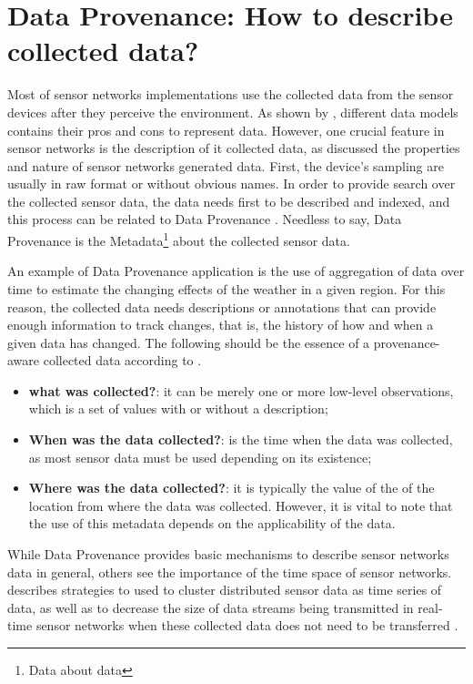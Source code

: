 \section{Data Provenance: How to describe collected data?}
\label{sec:sn-provenance}

Most of sensor networks implementations use the collected data from the sensor
devices after they perceive the environment. As shown by
\cite{sn-data-model-survey}, different data models contains their pros and
cons to represent data. However, one crucial feature in sensor networks is the
description of it collected data, as \cite{sn-provenance} discussed the
properties and nature of sensor networks generated data. First, the device's
sampling are usually in raw format or without obvious names. In order to
provide search over the collected sensor data, the data needs first to be
described and indexed, and this process can be related to Data Provenance
\cite{db-provenance}. Needless to say, Data Provenance is the
Metadata\footnote{Data about data} about the collected sensor data.

An example of Data Provenance application is the use of aggregation of data
over time to estimate the changing effects of the weather in a given region.
For this reason, the collected data needs descriptions or annotations that can
provide enough information to track changes, that is, the history of how and
when a given data has changed. The following should be the essence of a
provenance-aware collected data according to \cite{sn-provenance}.

\begin{itemize}
  \item \textbf{what was collected?}: it can be merely one or more low-level
  observations,  which is a set of values with or without a description;
  \item \textbf{When was the data collected?}: is the time when the data was
  collected,  as most sensor data must be used depending on its existence;
  \item \textbf{Where was the data collected?}: it is typically the value of 
  the of the location from where the data was collected. However, it is vital to
  note that the use of this metadata depends on the applicability of the data.
\end{itemize}

While Data Provenance provides basic mechanisms to describe sensor networks
data in general, others see the importance of the time space of sensor
networks. \cite{sn-time-series} describes strategies to used to cluster
distributed sensor data as time series of data, as well as to decrease the
size of data streams being transmitted in real-time sensor networks when these
collected data does not need to be transferred \cite{sn-data-reduction}.

